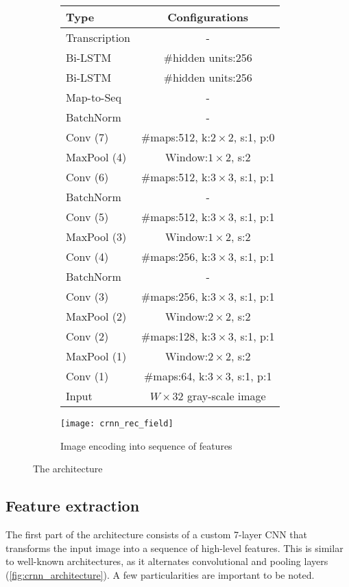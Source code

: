 		\begin{figure}
		\begin{subfigure}[c]{.48\linewidth}
		\begin{flushleft}
		\footnotesize
		\begin{tabular}{|l|c|}
			\hline
			\textbf{Type} & \textbf{Configurations}						\tabularnewline	\hline
																																				\hline
			Transcription & - 																\tabularnewline	\hline
			Bi-LSTM & \#hidden units:256						\tabularnewline	\hline
			Bi-LSTM & \#hidden units:256						\tabularnewline	\hline
			Map-to-Seq & - 															\tabularnewline	\hline
			BatchNorm & - 														\tabularnewline	\hline
			Conv (7) & \#maps:512, k:$2\times2$, s:1, p:0	\tabularnewline	\hline
			MaxPool (4) & Window:$1\times2$, s:2								\tabularnewline	\hline
			Conv (6) & \#maps:512, k:$3\times3$, s:1, p:1	\tabularnewline	\hline
			BatchNorm & - 														\tabularnewline	\hline
			Conv (5) & \#maps:512, k:$3\times3$, s:1, p:1	\tabularnewline	\hline
			MaxPool (3) & Window:$1\times2$, s:2 							\tabularnewline	\hline
			Conv (4) & \#maps:256, k:$3\times3$, s:1, p:1	\tabularnewline	\hline
			BatchNorm & - 														\tabularnewline	\hline
			Conv (3) & \#maps:256, k:$3\times3$, s:1, p:1	\tabularnewline	\hline
			MaxPool (2) & Window:$2\times2$, s:2								\tabularnewline	\hline
			Conv (2) & \#maps:128, k:$3\times3$, s:1, p:1	\tabularnewline	\hline
			MaxPool (1) & Window:$2\times2$, s:2 							\tabularnewline	\hline
			Conv (1) & \#maps:64, k:$3\times3$, s:1, p:1		\tabularnewline	\hline
			Input & $W\times32$ gray-scale image 							\tabularnewline	\hline
		\end{tabular}\par
		\caption[\CRNN{} structure]{}\label{fig:crnn_architecture}
		\end{flushleft}
		\end{subfigure}
		\begin{subfigure}[c]{.49\linewidth}
			\texttt{[image: crnn\_rec\_field]}
			\caption{Image encoding into sequence of features \citep[credit to][]{CRNN}}\label{fig:crnn_sequence}
		\end{subfigure}
		\caption{The \CRNN{} architecture}
		\end{figure}

	\subsection{Feature extraction}
		The first part of the \CRNN{} architecture consists of a custom 7-layer CNN that transforms the input image into a sequence of high-level features. This is similar to well-known architectures, as it alternates convolutional and pooling layers (\autoref{fig:crnn_architecture}). A few particularities are important to be noted.


